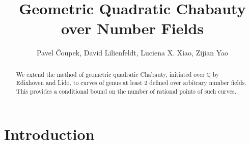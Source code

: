 \documentclass[11pt,oneside]{amsart}
\theoremstyle{plain}
\theoremstyle{definition}
\def\Q{\mathbb{Q}}
\begin{document}
 

 \title[Geometric Quadratic Chabauty]{\small Geometric Quadratic Chabauty over Number Fields}
\author{Pavel \v{C}oupek, David Lilienfeldt, Luciena X. Xiao, Zijian Yao}
\address[Pavel \v{C}oupek]{Department of Mathematics, Purdue University}
 \address[David Lilienfeldt]{Department of Mathematics, McGill University}
 \address[Luciena X. Xiao]{Department of Mathematics, California Institute of Technology}
\address[Zijian Yao]{Department of Mathematics, Harvard University}
\maketitle

\begin{abstract}
We extend the method of geometric quadratic Chabauty, initiated over $\Q$ by Edixhoven and Lido, to curves of genus at least $2$ defined over arbitrary number fields. This provides a conditional bound on the number of rational points of such curves. %
\end{abstract}


\tableofcontents
 
\vspace*{-1cm}
\section{Introduction} 
 
\end{document}
